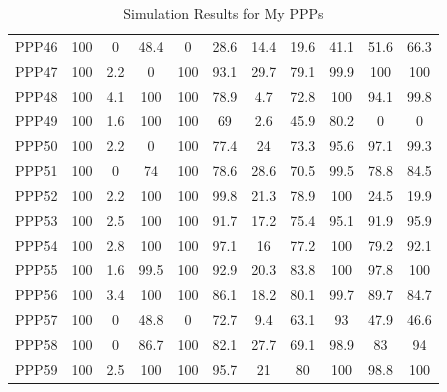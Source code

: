 \documentclass[authoryearcitations]{UoYCSproject}
\begin{document}
\begin{appendices}
\begin{table}
\begin{tabular}{|l|c|c|c|c|c|c|c|c|c|c|}
PPP46&100&0&48.4&0&28.6&14.4&19.6&41.1&51.6&66.3\\
PPP47&100&2.2&0&100&93.1&29.7&79.1&99.9&100&100\\
PPP48&100&4.1&100&100&78.9&4.7&72.8&100&94.1&99.8\\
PPP49&100&1.6&100&100&69&2.6&45.9&80.2&0&0\\
PPP50&100&2.2&0&100&77.4&24&73.3&95.6&97.1&99.3\\
PPP51&100&0&74&100&78.6&28.6&70.5&99.5&78.8&84.5\\
PPP52&100&2.2&100&100&99.8&21.3&78.9&100&24.5&19.9\\
PPP53&100&2.5&100&100&91.7&17.2&75.4&95.1&91.9&95.9\\
PPP54&100&2.8&100&100&97.1&16&77.2&100&79.2&92.1\\
PPP55&100&1.6&99.5&100&92.9&20.3&83.8&100&97.8&100\\
PPP56&100&3.4&100&100&86.1&18.2&80.1&99.7&89.7&84.7\\
PPP57&100&0&48.8&0&72.7&9.4&63.1&93&47.9&46.6\\
PPP58&100&0&86.7&100&82.1&27.7&69.1&98.9&83&94\\
PPP59&100&2.5&100&100&95.7&21&80&100&98.8&100\\
\hline
\end{tabular}
\caption{Simulation Results for My PPPs}
\end{table}

\end{appendices}
\end{document}
